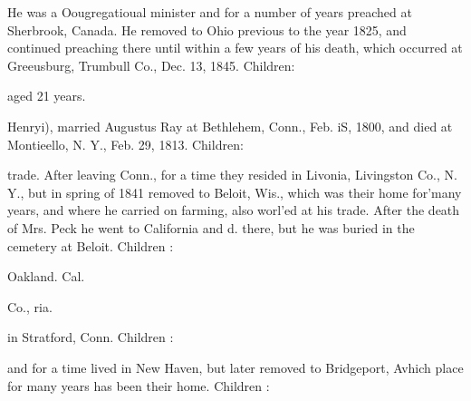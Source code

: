 \documentclass{book}
\begin{document}
He was a Oougregatioual minister and for a number of years 
preached at Sherbrook, Canada. He removed to Ohio previous 
to the year 1825, and continued preaching there until within a 
few years of his death, which occurred at Greeusburg, Trumbull 
Co., Dec. 13, 1845. Children: 




aged 21 years. 






Henryi), married Augustus Ray at Bethlehem, Conn., Feb. iS, 
1800, and died at Montieello, N. Y., Feb. 29, 1813. Children: 









trade. After leaving Conn., for a time they resided in Livonia, 
Livingston Co., N. Y., but in spring of 1841 removed to Beloit, 
Wis., which was their home for'many years, and where he 
carried on farming, also worl'ed at his trade. After the 
death of Mrs. Peck he went to California and d. there, but he 
was buried in the cemetery at Beloit. Children : 




Oakland. Cal. 



Co., ria. 



in Stratford, Conn. Children : 





and for a time lived in New Haven, but later removed 
to Bridgeport, Avhich place for many years has been 
their home. Children : 
\end{document}
